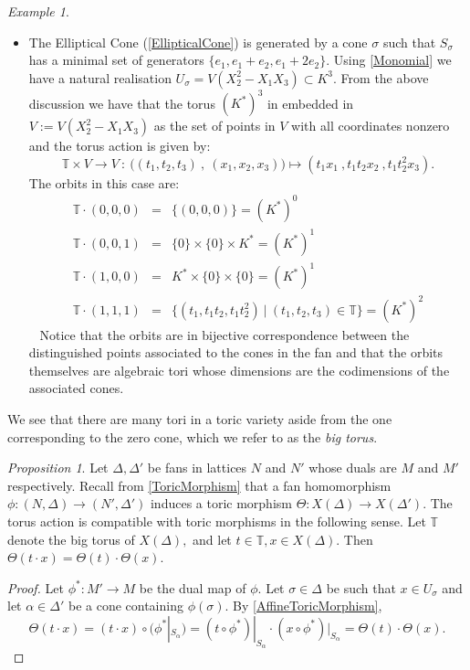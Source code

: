 \documentclass[BSc]{usydthesis}
\numberwithin{equation}{chapter}
\theoremstyle{remark}
\newtheorem{Proposition}[equation]{Proposition}
\newtheorem{Example}[equation]{Example}
\newcommand{\T}{\mathbb{T}}
\begin{document}
\begin{Example}
\begin{itemize}
  \item The Elliptical Cone (\ref{EllipticalCone}) is generated by a cone $\sigma$ such that $S_{\sigma}$ has a minimal set of generators $\{ e_1, e_1 + e_2, e_1 + 2e_2 \}.$ Using \ref{Monomial} we have a natural realisation $U_{\sigma} = V(X_2^2 - X_1 X_3) \subset K^3.$ From the above discussion we have that the torus $(K^*)^3$ in embedded in $V:=V(X_2^2-X_1X_3)$ as the set of points in $V$ with all coordinates nonzero and the torus action is given by: $$ \T \times V \to V \ : \ \bigg( (t_1, t_2, t_3) \ , \ (x_1, x_2, x_3) \bigg) \mapsto ( t_1x_1 \ , t_1t_2 x_2 \ , t_1 t_2^2 x_3 ).$$ The orbits in this case are:
\begin{eqnarray}
 \T\cdot (0,0,0) &=& \{ (0,0,0) \} = (K^*)^0      \nonumber \\
  \T\cdot (0,0,1) &=& \{ 0 \} \times \{ 0 \} \times K^* = (K^*)^1 \nonumber \\
  \T \cdot (1,0,0) &=& K^* \times \{ 0 \} \times \{ 0 \} = (K^*)^1 \nonumber \\
  \T \cdot (1,1,1) &=& \{ (t_1, t_1t_2, t_1t_2^2) \ | \ (t_1, t_2,t_3) \in \T \} = (K^*)^2 \nonumber
\end{eqnarray}
~
Notice that the orbits are in bijective correspondence between the distinguished points associated to the cones in the fan and that the orbits themselves are algebraic tori whose dimensions are the codimensions of the associated cones.
  \end{itemize}
\end{Example}

We see that there are many tori in a toric variety aside from the one corresponding to the zero cone, which we refer to as the {\em big torus}. 

\begin{Proposition}\label{Compatible}
 Let $\Delta, \Delta'$ be fans in lattices $N$ and $N'$ whose duals are $M$ and $M'$ respectively. Recall from \ref{ToricMorphism} that a fan homomorphism $\phi: (N, \Delta) \to (N', \Delta')$ induces a toric morphism $\Theta: X(\Delta) \to X(\Delta').$ The torus action is compatible with toric morphisms in the following sense. Let $\T$ denote the big torus of $X(\Delta),$ and let $t\in \T, x\in X(\Delta).$ Then $\Theta(t\cdot x) = \Theta(t) \cdot \Theta(x).$ 
\end{Proposition}

\begin{proof}
 Let $\phi^*:M' \to M$ be the dual map of $\phi.$ Let $\sigma \in \Delta$ be such that $x\in U_{\sigma}$ and let $\alpha \in \Delta'$ be a cone containing $\phi(\sigma).$ By \ref{AffineToricMorphism}, $$\Theta(t\cdot x) = (t\cdot x) \circ (\phi^*|_{S_{\alpha}}) = (t\circ \phi^*)|_{S_{\alpha}} \cdot (x\circ \phi^*)|_{S_{\alpha}} = \Theta(t)\cdot \Theta(x).$$
\end{proof}
\end{document}
